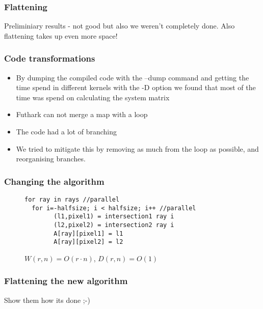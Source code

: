\documentclass{beamer}
\begin{document}
\begin{frame}
\frametitle{Flattening}
Preliminiary results - not good but also we weren't completely done. Also flattening takes up even more space!
\end{frame}

\begin{frame}
\frametitle{Code transformations}
\begin{itemize}
\item{By dumping the compiled code with the --dump command and getting the time spend in different kernels with the -D option we found that most of the time was spend on calculating the system matrix}
\item{Futhark can not merge a map with a loop}
\item{The code had a lot of branching}
\item{We tried to mitigate this by removing as much from the loop as possible, and reorganising branches.}
\end{itemize}
\end{frame}

\begin{frame}[fragile]
\frametitle{Changing the algorithm}
\begin{figure}[!h]
\begin{lstlisting}[frame=single]
for ray in rays //parallel
  for i=-halfsize; i < halfsize; i++ //parallel
        (l1,pixel1) = intersection1 ray i
        (l2,pixel2) = intersection2 ray i
        A[ray][pixel1] = l1
        A[ray][pixel2] = l2
\end{lstlisting}
  \caption{$W(r,n)=O(r\cdot n)$, $D(r,n)=O(1)$}
\end{figure}
\end{frame}

\begin{frame}
\frametitle{Flattening the new algorithm}
Show them how its done ;-)
\end{frame}

 \begin{frame}
 \nocite{*}
 
 
 \end{frame}
\end{document}
